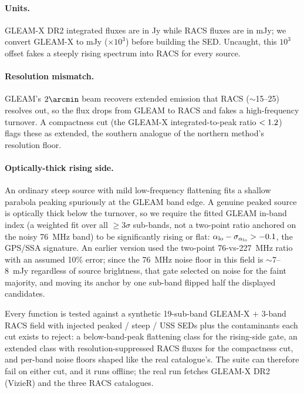 \documentclass[twocolumn]{aastex631}
\newcommand{\alo}{\ensuremath{\alpha_{\rm lo}}}
\begin{document}
\paragraph{Units.} GLEAM-X DR2 integrated fluxes are in Jy while RACS fluxes are in mJy; we convert
GLEAM-X to mJy ($\times10^3$) before building the SED. Uncaught, this $10^3$ offset fakes a steeply
rising spectrum into RACS for every source.

\paragraph{Resolution mismatch.} GLEAM's $2\arcmin$ beam recovers extended emission that RACS
($\sim$15--25\arcsec) resolves out, so the flux drops from GLEAM to RACS and fakes a high-frequency
turnover. A compactness cut (the GLEAM-X integrated-to-peak ratio $<1.2$) flags these as extended, the
southern analogue of the northern method's resolution floor.

\paragraph{Optically-thick rising side.} An ordinary steep source with mild low-frequency flattening
fits a shallow parabola peaking spuriously at the GLEAM band edge. A genuine peaked source is
optically thick below the turnover, so we require the fitted GLEAM in-band index (a
weighted fit over all $\ge3\sigma$ sub-bands, not a two-point ratio anchored on the noisy 76~MHz
band) to be significantly rising or flat: $\alo-\sigma_{\alo}>-0.1$, the GPS/SSA signature. An
earlier version used the two-point 76-vs-227~MHz ratio with an assumed 10\% error; since the
76~MHz noise floor in this field is $\sim$7--8~mJy regardless of source brightness, that gate
selected on noise for the faint majority, and moving its anchor by one sub-band flipped half the
displayed candidates.

Every function is tested against a synthetic 19-sub-band GLEAM-X $+$ 3-band RACS field with
injected peaked / steep / USS SEDs plus the contaminants each cut exists to reject: a
below-band-peak flattening class for the rising-side gate, an extended class with
resolution-suppressed RACS fluxes for the compactness cut, and per-band noise floors shaped like
the real catalogue's. The suite can therefore fail on either cut, and it runs offline; the real run
fetches GLEAM-X DR2 (VizieR) and the three RACS catalogues.
\end{document}
